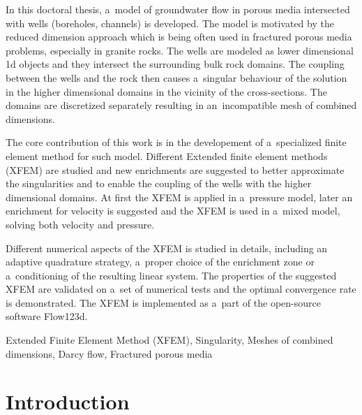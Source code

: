 \documentclass[bibliography=totocnumbered,dvipsnames,FM,Dis, EN]{tulthesis_autoreferat}
\begin{document}
\begin{abstractEN}
In this doctoral thesis, a~model of groundwater flow in porous media intersected with wells (boreholes, channels) is developed.
The model is motivated by the reduced dimension approach which is being often used in fractured porous media problems, especially in granite rocks.
The wells are modeled as lower dimensional 1d objects and they intersect the surrounding bulk rock domains.
The coupling between the wells and the rock then causes a~singular behaviour of the solution in the higher dimensional domains
in the vicinity of the cross-sections. The domains are discretized separately resulting in an~incompatible mesh of combined dimensions.

The core contribution of this work is in the developement of a~specialized finite element method for such model.
Different Extended finite element methods (XFEM) are studied and new enrichments are suggested to better
approximate the singularities and to enable the coupling of the wells with the higher dimensional domains.
At first the XFEM is applied in a~pressure model, later an enrichment for velocity
is suggested and the XFEM is used in a~mixed model, solving both velocity and pressure.

Different numerical aspects of the XFEM is studied in details, including an adaptive quadrature strategy,
a~proper choice of the enrichment zone or a~conditioning of the resulting linear system.
The properties of the suggested XFEM are validated on a~set of numerical tests and the optimal convergence
rate is demonstrated. The XFEM is implemented as a~part of the open-source software Flow123d.

\end{abstractEN}

\begin{keywordsEN}
Extended Finite Element Method (XFEM), Singularity, Meshes of combined dimensions,
Darcy flow, Fractured porous media
\end{keywordsEN}

\clearpage

\tableofcontents
\clearpage




\chapter{Introduction}

\end{document}
